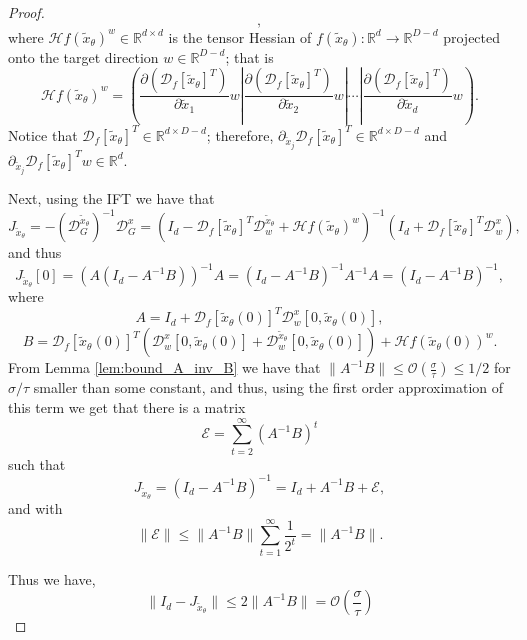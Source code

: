 \documentclass[12pt]{article}
\theoremstyle{remark}
\newcommand{\RR}{\mathbb{R}}
\newcommand{\DD}{\mathcal{D}}
\newcommand{\OO}{\mathcal{O}}
\newcommand{\HH}{\mathcal{H}}
\newcommand{\wtilde}[1]{\widetilde{#1}}
\begin{document}
\begin{appendices}
\begin{proof}
\begin{equation*}
,\end{equation*}
where $\HH f(\wtilde x_\theta)^w \in \RR^{d\times d}$ is the tensor Hessian of $f(\wtilde x_\theta):\RR^d\to\RR^{D-d}$ projected onto the target direction $w\in \RR^{D-d}$; that is
\begin{equation}\label{eq:H_w_def}
\HH f(\wtilde x_\theta)^w =
\left(\frac{\partial\left(\DD_f[\wtilde{x}_\theta]^T\right)}{\partial \wtilde{x}_1} w \right|\left. \frac{\partial\left(\DD_f[\wtilde{x}_\theta]^T\right)}{\partial \wtilde{x}_2} w \right| \cdots \left|\frac{\partial\left(\DD_f[\wtilde{x}_\theta]^T\right)}{\partial \wtilde{x}_d} w \right)
.\end{equation}
Notice that $\DD_f[\wtilde x_\theta]^T\in \RR^{d\times D-d}$; therefore, $\partial_{\wtilde x_j}\DD_f[\wtilde x_\theta]^T\in \RR^{d\times D-d}$ and $\partial_{\wtilde x_j}\DD_f[\wtilde x_\theta]^T w\in \RR^{d}$.

Next, using the IFT we have that 
\[
J_{\wtilde{x}_\theta} = -(\DD^{\wtilde{x}_\theta}_{G})^{-1} \DD^x_G = \left( I_d - \DD_f[\wtilde{x}_\theta]^T \DD^{\wtilde{x}_\theta}_ w + \HH f(\wtilde x_\theta)^w  \right)^{-1} \left(I_d + \DD_f[\wtilde{x}_\theta]^T \DD^x_w \right)
,\]
and thus
\[
J_{\wtilde{x}_\theta}[0] = (A(I_d-A^{-1}B))^{-1}A = (I_d-A^{-1}B)^{-1}A^{-1}A =  (I_d-A^{-1}B)^{-1}
,\]
where
\begin{equation}\label{eq:A_def}
A = I_d +  \DD_f[\wtilde{x}_\theta(0)]^T \DD^x_w[0,\wtilde{x}_\theta(0)]    
,\end{equation}
\begin{equation}\label{eq:B_def}
B = \DD_f[\wtilde{x}_\theta(0)]^T (\DD^x_w[0,\wtilde{x}_\theta(0)] + \DD^{\wtilde{x}_\theta}_w[0,\wtilde{x}_\theta(0)] )+ \HH f(\wtilde x_\theta(0))^w
.\end{equation}
From Lemma \ref{lem:bound_A_inv_B} we have that $\|A^{-1}B\| \leq \OO(\frac{\sigma}{\tau}) \leq 1/2$ for $\sigma/\tau$ smaller than some constant, and thus, using the first order approximation of this term we get that there is a matrix
\[\mathcal{E} = \sum_{t=2}^{\infty}(A^{-1}B)^t\]
such that
\[
J_{\wtilde{x}_\theta} = (I_d - A^{-1}B)^{-1} = I_d +A^{-1}B + \mathcal{E}
,\]
and
with
\[
\|\mathcal{E}\| \leq \|A^{-1}B\| \sum_{t=1}^\infty \frac{1}{2^t} = \|A^{-1}B\|
.\]

Thus we have, 
\begin{equation}\label{eq:I-J}
\|I_d -J_{\wtilde{x}_\theta}\| \leq  2\|A^{-1}B\|  =  \OO(\frac{\sigma}{\tau})
\end{equation}

\end{proof}


\end{appendices}
\end{document}
